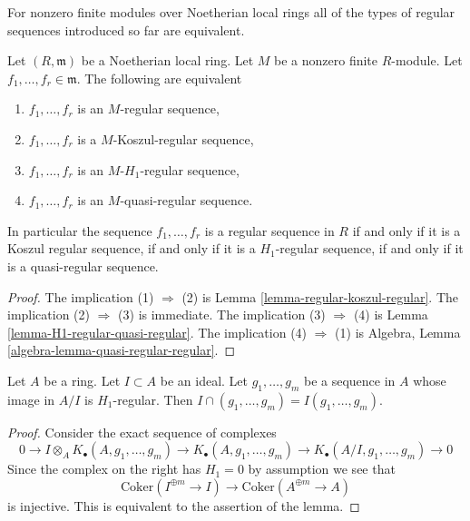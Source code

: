 \noindent
For nonzero finite modules over Noetherian local rings all of the types of
regular sequences introduced so far are equivalent.

\begin{lemma}
\label{lemma-noetherian-finite-all-equivalent}
Let $(R, \mathfrak m)$ be a Noetherian local ring. Let $M$ be a nonzero
finite $R$-module. Let $f_1, \ldots, f_r \in \mathfrak m$. The following
are equivalent
\begin{enumerate}
\item $f_1, \ldots, f_r$ is an $M$-regular sequence,
\item $f_1, \ldots, f_r$ is a $M$-Koszul-regular sequence,
\item $f_1, \ldots, f_r$ is an $M$-$H_1$-regular sequence,
\item $f_1, \ldots, f_r$ is an $M$-quasi-regular sequence.
\end{enumerate}
In particular the sequence $f_1, \ldots, f_r$ is a regular sequence
in $R$ if and only if it is a Koszul regular sequence, if and only if
it is a $H_1$-regular sequence, if and only if it is a quasi-regular sequence.
\end{lemma}

\begin{proof}
The implication (1) $\Rightarrow$ (2) is 
Lemma \ref{lemma-regular-koszul-regular}.
The implication (2) $\Rightarrow$ (3) is immediate.
The implication (3) $\Rightarrow$ (4) is 
Lemma \ref{lemma-H1-regular-quasi-regular}.
The implication (4) $\Rightarrow$ (1) is
Algebra, Lemma \ref{algebra-lemma-quasi-regular-regular}.
\end{proof}

\begin{lemma}
\label{lemma-H1-regular-in-quotient}
Let $A$ be a ring. Let $I \subset A$ be an ideal.
Let $g_1, \ldots, g_m$ be a sequence in $A$ whose image in
$A/I$ is $H_1$-regular. Then $I \cap (g_1, \ldots, g_m) =
I(g_1, \ldots, g_m)$.
\end{lemma}

\begin{proof}
Consider the exact sequence of complexes
$$
0 \to I \otimes_A K_\bullet(A, g_1, \ldots, g_m)
\to K_\bullet(A, g_1, \ldots, g_m) \to
K_\bullet(A/I, g_1, \ldots, g_m) \to 0
$$
Since the complex on the right has $H_1 = 0$ by assumption we
see that
$$
\text{Coker}(I^{\oplus m} \to I)
\longrightarrow
\text{Coker}(A^{\oplus m} \to A)
$$
is injective. This is equivalent to the assertion of the lemma.
\end{proof}

